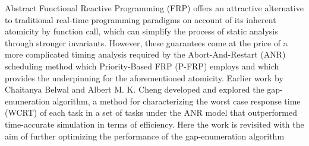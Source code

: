 \documentclass{article}
\begin{document}
\tableofcontents

\begin{section}{Abstract}
  Functional Reactive Programming (FRP) offers an attractive alternative to traditional
  real-time programming paradigms on account of its inherent atomicity by function call,
  which can simplify the process of static analysis through stronger invariants.
  However, these guarantees come at the price of a more complicated timing analysis
  required by the Abort-And-Restart (ANR) scheduling method which Priority-Based FRP
  (P-FRP) employs and which provides the underpinning for the aforementioned atomicity.
  Earlier work by Chaitanya Belwal and Albert M. K. Cheng developed and explored the
  gap-enumeration algorithm, a method for characterizing the worst case response time (WCRT)
  of each task in a set of tasks under the ANR model that outperformed time-accurate simulation
  in terms of efficiency. Here the work is revisited with the aim of further optimizing the
  performance of the gap-enumeration algorithm
\end{section}
\end{document}
